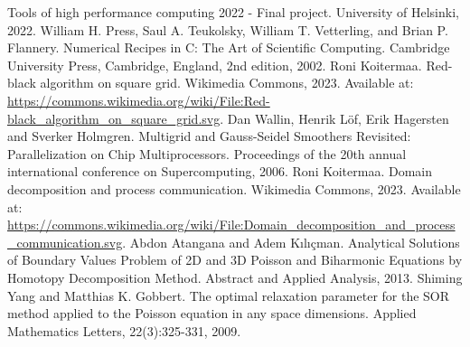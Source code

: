 \documentclass[10pt]{article}
\begin{document}
\begin{thebibliography}{9}
 Tools of high performance computing 2022 - Final project. University of Helsinki, 2022.
 William H. Press, Saul A. Teukolsky, William T. Vetterling, and Brian P. Flannery. Numerical Recipes in C: The Art of Scientific Computing. Cambridge University Press, Cambridge, England, 2nd edition, 2002.
 Roni Koitermaa. Red-black algorithm on square grid. Wikimedia Commons, 2023. Available at: \url{https://commons.wikimedia.org/wiki/File:Red-black_algorithm_on_square_grid.svg}.
 Dan Wallin, Henrik Löf, Erik Hagersten and Sverker Holmgren. Multigrid and Gauss-Seidel Smoothers Revisited: Parallelization on Chip Multiprocessors. Proceedings of the 20th annual international conference on Supercomputing, 2006.
 Roni Koitermaa. Domain decomposition and process communication. Wikimedia Commons, 2023. Available at: \url{https://commons.wikimedia.org/wiki/File:Domain_decomposition_and_process_communication.svg}.
 Abdon Atangana and Adem Kılıçman. Analytical Solutions of Boundary Values Problem of 2D and 3D Poisson and Biharmonic Equations by Homotopy Decomposition Method. Abstract and Applied Analysis, 2013.
 Shiming Yang and Matthias K. Gobbert. The optimal relaxation parameter for the SOR method applied to the Poisson equation in any space dimensions. Applied Mathematics Letters, 22(3):325-331, 2009.
\end{thebibliography}
\end{document}
